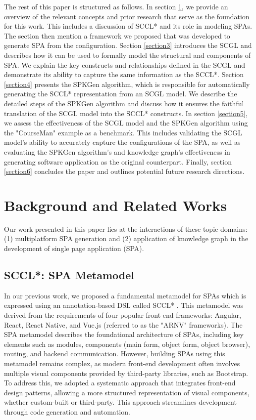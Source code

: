 \documentclass[runningheads]{llncs}
\begin{document}
The rest of this paper is structured as follows. In section \ref{section2}, we provide an overview of the relevant concepts and prior research that serve as the foundation for this work. This includes a discussion of SCCL* and its role in modeling SPAs. The section then mention a framework we proposed that was developed to generate SPA from the configuration. Section \ref{section3} introduces the SCGL and describes how it can be used to formally model the structural and components of SPA. We explain the key constructs and relationships defined in the SCGL and demonstrate its ability to capture the same information as the SCCL*. Section \ref{section4} presents the SPKGen algorithm, which is responsible for automatically generating the SCCL* representation from an SCGL model. We describe the detailed steps of the SPKGen algorithm and discuss how it ensures the faithful translation of the SCGL model into the SCCL* constructs. In section \ref{section5}, we assess the effectiveness of the SCGL model and the SPKGen algorithm using the "CourseMan" example as a benchmark. This includes validating the SCGL model's ability to accurately capture the configurations of the SPA, as well as evaluating the SPKGen algorithm's and knowledge graph's effectiveness in generating software application as the original counterpart. Finally, section \ref{section6} concludes the paper and outlines potential future research directions.

\section{Background and Related Works} \label{section2}
\vspace{-0.2cm}

Our work presented in this paper lies at the interactions of these topic domains: (1) multiplatform SPA generation and (2) application of knowledge graph in the development of single page application (SPA). 

\subsection{SCCL*: SPA Metamodel}
In our previous work, we proposed a fundamental metamodel for SPAs which is expressed using an annotation-based DSL called SCCL* \cite{le_generating_2022}. This metamodel was derived from the requirements of four popular front-end frameworks: Angular, React, React Native, and Vue.js (referred to as the "ARNV" frameworks). The SPA metamodel describes the foundational architecture of SPAs, including key elements such as modules, components (main form, object form, object browser), routing, and backend communication.
However, building SPAs using this metamodel remains complex, as modern front-end development often involves multiple visual components provided by third-party libraries, such as Bootstrap. To address this, we adopted a systematic approach that integrates front-end design patterns, allowing a more structured representation of visual components, whether custom-built or third-party. This approach streamlines development through code generation and automation.
\end{document}
